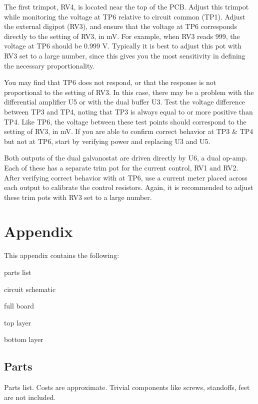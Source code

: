 \documentclass{manual}
\begin{document}
The first trimpot, RV4, is located near the top of the PCB.
Adjust this trimpot while monitoring the voltage at TP6 relative to circuit common (TP1).
Adjust the external digipot (RV3), and ensure that the voltage at TP6 corresponds directly to the setting of RV3, in mV.
For example, when RV3 reads 999, the voltage at TP6 should be 0.999 V.
Typically it is best to adjust this pot with RV3 set to a large number, since this gives you the most sensitivity in defining the necessary proportionality.

You may find that TP6 does not respond, or that the response is not proportional to the setting of RV3.
In this case, there may be a problem with the differential amplifier U5 or with the dual buffer U3.
Test the voltage difference between TP3 and TP4, noting that TP3 is always equal to or more positive than TP4.
Like TP6, the voltage between these test points should correspond to the setting of RV3, in mV.
If you are able to confirm correct behavior at TP3 \& TP4 but not at TP6, start by verifying power and replacing U3 and U5.

Both outputs of the dual galvanostat are driven directly by U6, a dual op-amp.
Each of these has a separate trim pot for the current control, RV1 and RV2.
After verifying correct behavior with at TP6, use a current meter placed across each output to calibrate the control resistors.
Again, it is recommended to adjust these trim pots with RV3 set to a large number.

\section{Appendix}

This appendix contains the following:
\begin{ditemize}
  \item parts list
  \item circuit schematic
  \item full board
  \item top layer
  \item bottom layer
\end{ditemize}

\clearpage
\subsection{Parts}

Parts list.
Costs are approximate.
Trivial components like screws, standoffs, feet are not included.
\end{document}
